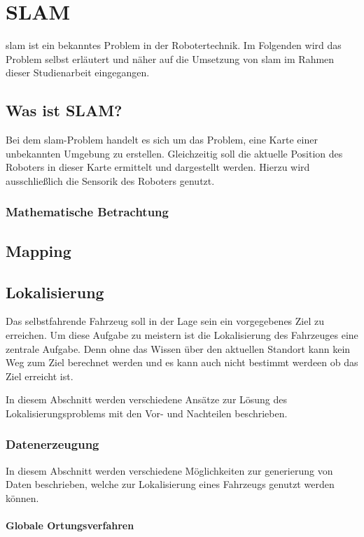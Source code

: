 \section{SLAM}
\ac{slam} ist ein bekanntes Problem in der Robotertechnik. 
Im Folgenden wird das Problem selbst erläutert und näher auf die Umsetzung von \ac{slam} im Rahmen dieser Studienarbeit eingegangen.

\subsection{Was ist SLAM?}
Bei dem \ac{slam}-Problem handelt es sich um das Problem, eine Karte einer unbekannten Umgebung zu erstellen.
Gleichzeitig soll die aktuelle Position des Roboters in dieser Karte ermittelt und dargestellt werden.
Hierzu wird ausschließlich die Sensorik des Roboters genutzt.

\subsubsection{Mathematische Betrachtung}


\subsection{Mapping}

\subsection{Lokalisierung}
Das selbstfahrende Fahrzeug soll in der Lage sein ein vorgegebenes Ziel zu erreichen. 
Um diese Aufgabe zu meistern ist die Lokalisierung des Fahrzeuges eine zentrale Aufgabe. 
Denn ohne das Wissen über den aktuellen Standort kann kein Weg zum Ziel berechnet werden 
und es kann auch nicht bestimmt werdeen ob das Ziel erreicht ist.

In diesem Abschnitt werden verschiedene Ansätze zur Lösung des Lokalisierungsproblems mit den Vor- und Nachteilen beschrieben.

\subsubsection{Datenerzeugung}
In diesem Abschnitt werden verschiedene Möglichkeiten zur generierung von Daten beschrieben, welche zur Lokalisierung eines Fahrzeugs genutzt werden können.

\paragraph{Globale Ortungsverfahren} \mbox{}\\

